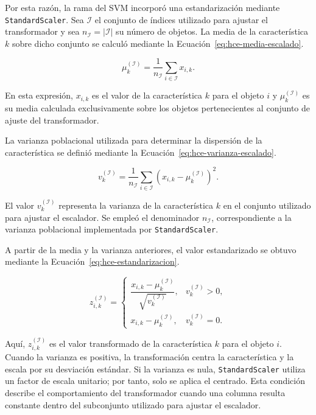 Por esta razón, la rama del SVM incorporó una estandarización mediante \texttt{StandardScaler}. Sea $\mathcal I$ el conjunto de índices utilizado para ajustar el transformador y sea $n_{\mathcal I}=|\mathcal I|$ su número de objetos. La media de la característica $k$ sobre dicho conjunto se calculó mediante la Ecuación~\eqref{eq:hce-media-escalado}.

\begin{equation}
\mu_k^{(\mathcal I)}
=
\frac{1}{n_{\mathcal I}}
\sum_{i\in\mathcal I}x_{i,k}.
\label{eq:hce-media-escalado}
\end{equation}

En esta expresión, $x_{i,k}$ es el valor de la característica $k$ para el objeto $i$ y $\mu_k^{(\mathcal I)}$ es su media calculada exclusivamente sobre los objetos pertenecientes al conjunto de ajuste del transformador.

La varianza poblacional utilizada para determinar la dispersión de la característica se definió mediante la Ecuación~\eqref{eq:hce-varianza-escalado}.

\begin{equation}
v_k^{(\mathcal I)}
=
\frac{1}{n_{\mathcal I}}
\sum_{i\in\mathcal I}
\left(
x_{i,k}-\mu_k^{(\mathcal I)}
\right)^2.
\label{eq:hce-varianza-escalado}
\end{equation}

El valor $v_k^{(\mathcal I)}$ representa la varianza de la característica $k$ en el conjunto utilizado para ajustar el escalador. Se empleó el denominador $n_{\mathcal I}$, correspondiente a la varianza poblacional implementada por \texttt{StandardScaler}.

A partir de la media y la varianza anteriores, el valor estandarizado se obtuvo mediante la Ecuación~\eqref{eq:hce-estandarizacion}.

\begin{equation}
z_{i,k}^{(\mathcal I)}
=
\begin{cases}
\dfrac{x_{i,k}-\mu_k^{(\mathcal I)}}
{\sqrt{v_k^{(\mathcal I)}}},
&
v_k^{(\mathcal I)}>0,\\[3mm]
x_{i,k}-\mu_k^{(\mathcal I)},
&
v_k^{(\mathcal I)}=0.
\end{cases}
\label{eq:hce-estandarizacion}
\end{equation}

Aquí, $z_{i,k}^{(\mathcal I)}$ es el valor transformado de la característica $k$ para el objeto $i$. Cuando la varianza es positiva, la transformación centra la característica y la escala por su desviación estándar. Si la varianza es nula, \texttt{StandardScaler} utiliza un factor de escala unitario; por tanto, solo se aplica el centrado. Esta condición describe el comportamiento del transformador cuando una columna resulta constante dentro del subconjunto utilizado para ajustar el escalador.

